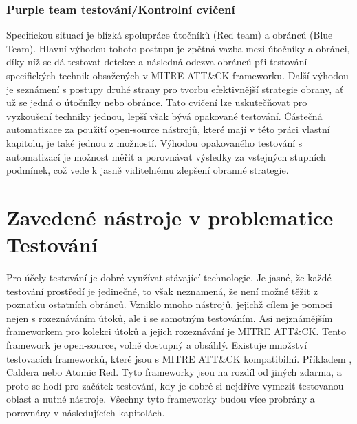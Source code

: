 \subsubsection{Purple team testování/Kontrolní cvičení}
Specifickou situací je blízká spolupráce útočníků (Red team) a obránců (Blue Team).
Hlavní výhodou tohoto postupu je zpětná vazba mezi útočníky a obránci, díky níž se dá testovat detekce a následná odezva obránců při testování specifických technik obsažených v MITRE ATT\&CK frameworku.
Další výhodou je seznámení s postupy druhé strany pro tvorbu efektivnější strategie obrany, ať už se jedná o útočníky nebo obránce.
Tato cvičení lze uskutečňovat pro vyzkoušení techniky jednou, lepší však bývá opakované testování.
Částečná automatizace za použití open-source nástrojů, které mají v této práci vlastní kapitolu, je také jednou z možností.
Výhodou opakovaného testování s automatizací je možnost měřit a porovnávat výsledky za vstejných stupních podmínek, což vede k jasně viditelnému zlepšení obranné strategie.\cite{securityInteligence_pen_test_red_team_purple_team,redscan_team_purple_team}

\section{Zavedené nástroje v problematice Testování}\label{sec:zavedene-nastroje-v-problematice-testovani}
Pro účely testování je dobré využívat stávající technologie.
Je jasné, že každé testování prostředí je jedinečné, to však neznamená, že není možné těžit z poznatku ostatních obránců.
Vzniklo mnoho nástrojů, jejichž cílem je pomoci nejen s rozeznáváním útoků, ale i se samotným testováním.
Asi nejznámějším frameworkem pro kolekci útoků a jejich rozeznávání je MITRE ATT\&CK\cite{mitre_attack_framework}.
Tento framework je open-source, volně dostupný a obsáhlý.
Existuje množství testovacích frameworků, které jsou s MITRE ATT\&CK kompatibilní\cite{csoonline_4_testing_frameworks}.
Příkladem , Caldera nebo Atomic Red.
Tyto frameworky jsou na rozdíl od jiných zdarma, a proto se hodí pro začátek testování, kdy je dobré si nejdříve vymezit testovanou oblast a nutné nástroje.
Všechny tyto frameworky budou více probrány a porovnány v následujících kapitolách.

